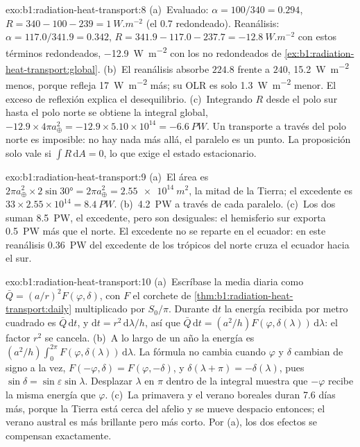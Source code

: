 \begin{solution}{exo:b1:radiation-heat-transport:8}
(a)~Evaluado: $\alpha = 100/340 = 0.294$, $R = 340 - 100 - 239 =
\qty{+1}{W.m^{-2}}$ (el \num{0.7} redondeado). Reanálisis: $\alpha = 117.0/341.9 =
0.342$, $R = 341.9 - 117.0 - 237.7 = \qty{-12.8}{W.m^{-2}}$ con estos términos redondeados,
\qty{-12.9}{W.m^{-2}} con los no redondeados de
\cref{ex:b1:radiation-heat-transport:global}. (b)~El reanálisis
absorbe $224.8$ frente a $240$, \qty{15.2}{W.m^{-2}} menos, porque refleja
\qty{17}{W.m^{-2}} más; su OLR es solo \qty{1.3}{W.m^{-2}} menor. El exceso de
reflexión explica el desequilibrio. (c)~Integrando $R$ desde el polo sur hasta el
polo norte se obtiene la integral global, $-12.9 \times 4\pi a_\oplus^2 = -12.9 \times
5.10\times10^{14} = \qty{-6.6}{PW}$. Un transporte a través del polo norte es
imposible: no hay nada más allá, el paralelo es un punto. La proposición
solo vale si $\int R\,\mathrm dA = 0$, lo que exige el estado estacionario.
\end{solution}

\begin{solution}{exo:b1:radiation-heat-transport:9}
(a)~El área es $2\pi a_\oplus^2 \times 2\sin\ang{30} = 2\pi a_\oplus^2 =
\qty{2.55e14}{m^2}$, la mitad de la Tierra; el excedente es $33 \times 2.55\times10^{14} =
\qty{8.4}{PW}$. (b)~\qty{4.2}{PW} a través de cada paralelo. (c)~Los dos suman
\qty{8.5}{PW}, el excedente, pero son desiguales: el hemisferio sur exporta
\qty{0.5}{PW} más que el norte. El excedente no se reparte en el ecuador: en este reanálisis \qty{0.36}{PW} del excedente de los trópicos del norte cruza el ecuador hacia el sur.
\end{solution}

\begin{solution}{exo:b1:radiation-heat-transport:10}
(a)~Escríbase la media diaria como $\bar Q = (a/r)^2 F(\varphi, \delta)$, con $F$ el
corchete de \cref{thm:b1:radiation-heat-transport:daily} multiplicado por $S_0/\pi$. Durante
$\mathrm dt$ la energía recibida por metro cuadrado es $\bar Q\,\mathrm dt$, y
$\mathrm dt = r^2\,\mathrm d\lambda/h$, así que $\bar Q\,\mathrm dt = (a^2/h)
F(\varphi, \delta(\lambda))\,\mathrm d\lambda$: el factor $r^2$ se cancela.
(b)~A lo largo de un año la energía es $(a^2/h)\int_0^{2\pi} F(\varphi,
\delta(\lambda))\,\mathrm d\lambda$. La fórmula no cambia cuando $\varphi$ y
$\delta$ cambian de signo a la vez, $F(-\varphi, \delta) = F(\varphi, -\delta)$, y
$\delta(\lambda + \pi) = -\delta(\lambda)$, pues $\sin\delta = \sin\varepsilon
\sin\lambda$. Desplazar $\lambda$ en $\pi$ dentro de la integral muestra que $-\varphi$
recibe la misma energía que $\varphi$. (c)~La primavera y el verano boreales duran
\num{7.6} días más, porque la Tierra está cerca del afelio y se mueve despacio entonces; el verano austral es más brillante pero más corto. Por (a), los dos efectos se compensan exactamente.
\end{solution}

